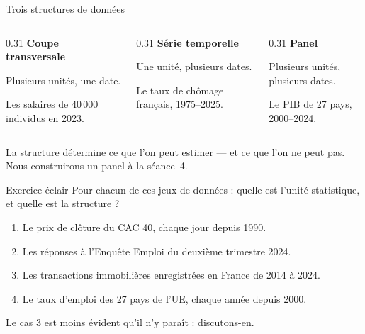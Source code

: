 \documentclass[10pt,aspectratio=169]{beamer}
\begin{document}
\begin{frame}{Trois structures de données}
\begin{columns}[T]
\begin{column}{0.31\textwidth}
\textbf{Coupe transversale}

\vspace{0.5em}
Plusieurs unités, une date.

\vspace{0.5em}
\small\color{CYgris}
Les salaires de 40\,000 individus en 2023.
\end{column}
\begin{column}{0.31\textwidth}
\textbf{Série temporelle}

\vspace{0.5em}
Une unité, plusieurs dates.

\vspace{0.5em}
\small\color{CYgris}
Le taux de chômage français, 1975--2025.
\end{column}
\begin{column}{0.31\textwidth}
\textbf{Panel}

\vspace{0.5em}
Plusieurs unités, plusieurs dates.

\vspace{0.5em}
\small\color{CYgris}
Le PIB de 27 pays, 2000--2024.
\end{column}
\end{columns}

\vspace{2em}
La structure détermine ce que l'on peut estimer --- et ce que l'on ne peut pas. Nous construirons un panel à la séance~4.
\end{frame}

\begin{frame}{Exercice éclair}
Pour chacun de ces jeux de données : quelle est l'unité statistique, et quelle est la structure ?

\vspace{1.5em}
\begin{enumerate}
  \item Le prix de clôture du CAC 40, chaque jour depuis 1990.
  \item Les réponses à l'Enquête Emploi du deuxième trimestre 2024.
  \item Les transactions immobilières enregistrées en France de 2014 à 2024.
  \item Le taux d'emploi des 27 pays de l'UE, chaque année depuis 2000.
\end{enumerate}

\vspace{1.5em}
\small\color{CYgris}
Le cas 3 est moins évident qu'il n'y paraît : discutons-en.
\end{frame}
\end{document}
